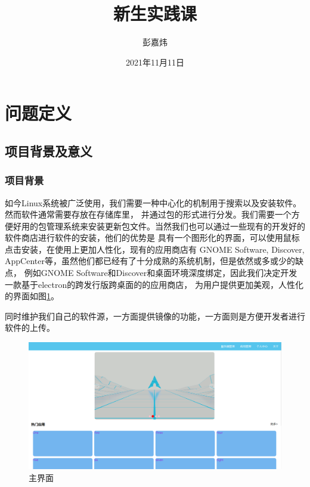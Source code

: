 \documentclass[supercite]{Experimental_Report}
\title{~~~~~~新生实践课~~~~~~}
\author{彭嘉炜}
\date{2021年11月11日}
\theoremstyle{definition}
\begin{document}
\maketitle

\clearpage


\tableofcontents[level=2]
\clearpage


\section{问题定义}

\subsection{项目背景及意义}

\subsubsection{项目背景}

如今Linux系统被广泛使用，我们需要一种中心化的机制用于搜索以及安装软件。然而软件通常需要存放在存储库里，
并通过包的形式进行分发。我们需要一个方便好用的包管理系统来安装更新包文件。当然我们也可以通过一些现有的开发好的软件商店进行软件的安装，他们的优势是
具有一个图形化的界面，可以使用鼠标点击安装，在使用上更加人性化，现有的应用商店有 GNOME Software, Discover, 
AppCenter等，虽然他们都已经有了十分成熟的系统机制，但是依然或多或少的缺点，
例如GNOME Software和Discover和桌面环境深度绑定，因此我们决定开发一款基于electron的跨发行版跨桌面的的应用商店，
为用户提供更加美观，人性化的界面如图\ref{UnixAppstore}。

同时维护我们自己的软件源，一方面提供镜像的功能，一方面则是方便开发者进行软件的上传。
\begin{figure}[ht]
    \centering
    \includegraphics[scale=0.25]{./images/UnixAppstore}
    \caption{主界面}
	\label{UnixAppstore}
\end{figure}
\end{document}
